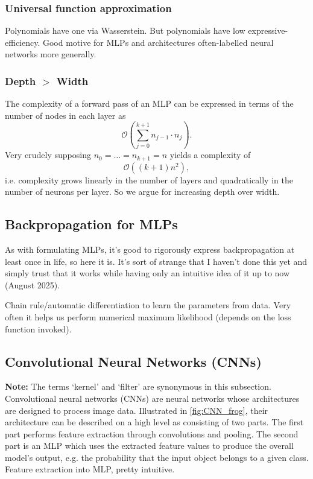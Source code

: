 \documentclass[11pt]{article}
\begin{document}
\subsubsection{Universal function approximation}
\label{subsubsec:universal_function_approximation_theorem}
Polynomials have one via Wasserstein. But polynomials have low expressive-efficiency. Good motive for MLPs and architectures often-labelled neural networks more generally.

\subsubsection{Depth $>$ Width}
\label{subsubsec:deep_MLPs}
The complexity of a forward pass of an MLP can be expressed in terms of the number of nodes in each layer as
$$
\mathcal{O}
\left(
\sum_{j=0}^{k+1}n_{j-1}\cdot n_j
\right).
$$
Very crudely supposing $n_0=\dots=n_{k+1}=n$ yields a complexity of
$$
\mathcal{O}((k+1)n^2),
$$
i.e. complexity grows linearly in the number of layers and quadratically in the number of neurons per layer. So we argue for increasing depth over width.

\subsection{Backpropagation for MLPs}
\label{subsec:backprop}
As with formulating MLPs, it's good to rigorously express backpropagation at least once in life, so here it is. It's sort of strange that I haven't done this yet and simply trust that it works while having only an intuitive idea of it up to now (August 2025).

Chain rule/automatic differentiation to learn the parameters from data. Very often it helps us perform numerical maximum likelihood (depends on the loss function invoked).

\subsection{Convolutional Neural Networks (CNNs)}
\label{subsec:conv_neural_networks}

\textbf{Note:} The terms `kernel' and `filter' are synonymous in this subsection.\\

\noindent Convolutional neural networks (CNNs) are neural networks whose architectures are designed to process image data. Illustrated in \autoref{fig:CNN_frog}, their architecture can be described on a high level as consisting of two parts. The first part performs feature extraction through convolutions and pooling. The second part is an MLP which uses the extracted feature values to produce the overall model's output, e.g. the probability that the input object belongs to a given class. Feature extraction into MLP, pretty intuitive.
\end{document}
